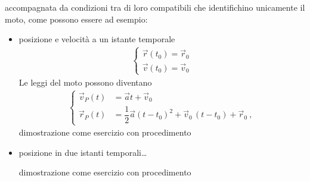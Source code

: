 \documentclass[letterpaper,10pt,italian]{jupyterBook}
\begin{document}
\sphinxAtStartPar
accompagnata da condizioni tra di loro compatibili che identifichino unicamente il moto, come possono essere ad esempio:
\begin{itemize}
\item {} 
\sphinxAtStartPar
posizione e velocità a un istante temporale
\begin{equation*}
\begin{split}\begin{cases}
    \vec{r}(t_0) = \vec{r}_0 \\
    \vec{v}(t_0) = \vec{v}_0
  \end{cases}\end{split}
\end{equation*}
\sphinxAtStartPar
Le leggi del moto possono diventano
\begin{equation*}
\begin{split}\begin{cases}
    \vec{v}_P(t) & = \vec{a} t                     + \vec{v}_0  \\
    \vec{r}_P(t) & = \dfrac{1}{2}\vec{a} (t-t_0)^2 + \vec{v}_0 \, ( t - t_0 ) + \vec{r}_0 \ ,
  \end{cases}\end{split}
\end{equation*}
\sphinxAtStartPar
{} dimostrazione come esercizio con procedimento

\item {} 
\sphinxAtStartPar
posizione in due istanti temporali… 

\sphinxAtStartPar
{} dimostrazione come esercizio con procedimento

\end{itemize}
\end{document}
